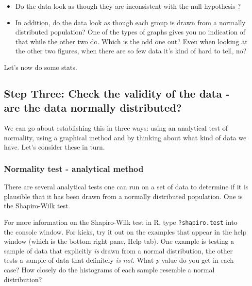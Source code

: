 \documentclass[
  letterpaper,
  DIV=11,
  numbers=noendperiod]{scrreprt}
\begin{document}
\begin{itemize}
\item
  Do the data look as though they are inconsistent with the null
  hypothesis ?
\item
  In addition, do the data look as though each group is drawn from a
  normally distributed population? One of the types of graphs gives you
  no indication of that while the other two do. Which is the odd one
  out? Even when looking at the other two figures, when there are so few
  data it's kind of hard to tell, no?
\end{itemize}

Let's now do some stats.

\subsection{Step Three: Check the validity of the data - are the data
normally
distributed?}\label{step-three-check-the-validity-of-the-data---are-the-data-normally-distributed}

We can go about establishing this in three ways: using an analytical
test of normality, using a graphical method and by thinking about what
kind of data we have. Let's consider these in turn.

\subsubsection{Normality test - analytical
method}\label{normality-test---analytical-method}

There are several analytical tests one can run on a set of data to
determine if it is plausible that it has been drawn from a normally
distributed population. One is the Shapiro-Wilk test.

For more information on the Shapiro-Wilk test in R, type
\texttt{?shapiro.test} into the console window. For kicks, try it out on
the examples that appear in the help window (which is the bottom right
pane, Help tab). One example is testing a sample of data that explicitly
\emph{is} drawn from a normal distribution, the other tests a sample of
data that definitely \emph{is not}. What \emph{p}-value do you get in
each case? How closely do the histograms of each sample resemble a
normal distribution?
\end{document}
